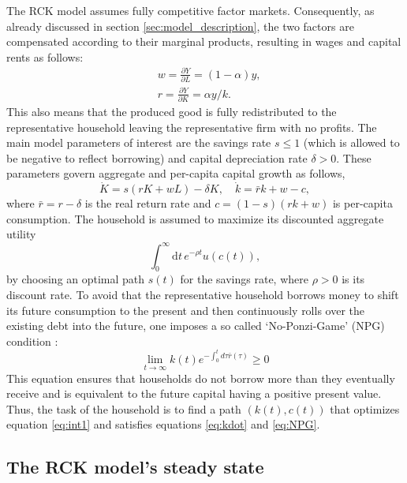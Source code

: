 The RCK model assumes fully competitive factor markets. Consequently, as already discussed in section \ref{sec:model_description}, the two factors are compensated according to their marginal products, resulting in wages and capital rents as follows:
\begin{align}
  &w = \frac{\partial Y}{\partial L} = (1 - \alpha) y, \label{eq:wages}\\
  &r = \frac{\partial Y}{\partial K} = \alpha y /k. \label{eq:capital_rents}
\end{align}
This also means that the produced good is fully redistributed to the representative household leaving the representative firm with no profits.
The main model parameters of interest are the savings rate $s \le 1$ (which is allowed to be negative to reflect borrowing) 
and capital depreciation rate $\delta > 0$. These parameters govern aggregate and per-capita capital growth as follows, 
\begin{equation}
        \dot{K} = s(rK + wL) - \delta K,
        \quad \dot k = \bar{r}k + w - c,
\label{eq:kdot}
\end{equation}
where $\bar{r}=r-\delta$ is the real return rate and $c=(1-s)(rk+w)$ is per-capita consumption.
The household is assumed to maximize its discounted aggregate utility
\begin{equation}
        \int_0^{\infty} \! \mathrm{d}t \, e^{-\rho t} u(c(t)), 
        \label{eq:int1}
\end{equation}
by choosing an optimal path $s(t)$ for the savings rate, where $\rho>0$ is its discount rate.
To avoid that the representative household borrows money to shift its future consumption to the present and then continuously rolls over the existing debt into the future, one imposes a so called `No-Ponzi-Game' (NPG) condition \citep[p. 292]{Acemoglu2009}:
\begin{equation}
  \lim_{t \rightarrow \infty} k(t) e^{-\int_{0}^{t}d\tau \bar{r}(\tau)} \geq 0
  \label{eq:NPG}
\end{equation}
This equation ensures that households do not borrow more than they eventually receive and is equivalent to the future capital having a positive present value.
Thus, the task of the household is to find a path $(k(t),c(t))$ that optimizes equation \eqref{eq:int1} and satisfies equations \eqref{eq:kdot}  and \eqref{eq:NPG}.

\subsection{The RCK model's steady state}

